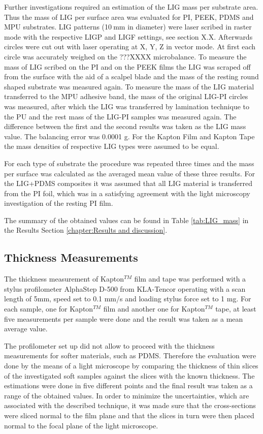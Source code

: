 Further investigations required an estimation of the LIG mass per substrate area. Thus the mass of LIG per surface area was evaluated for PI, PEEK, PDMS and MPU substrates. LIG patterns (10$\:$mm in diameter) were laser scribed in raster mode with the respective LIGP and LIGF settings, see section X.X. Afterwards circles were cut out with laser operating at X, Y, Z in vector mode.  At first each circle was accurately weighed on the ???XXXX microbalance. To measure the mass of LIG scribed on the PI and on the PEEK films the LIG was scraped off from the surface with the aid of a scalpel blade and the mass of the resting round shaped substrate was measured again. To measure the mass of the LIG material transferred to the MPU adhesive band, the mass of the original LIG-PI circles was measured, after which the LIG was transferred by lamination technique to the PU and the rest mass of the LIG-PI samples was measured again. The difference between the first and the second results was taken as the LIG mass value. The balancing error was 0.0001 g. For the Kapton Film and Kapton Tape the mass densities of respective LIG types were assumed to be equal. 

For each type of substrate the procedure was repeated three times and the mass per surface was calculated as the averaged mean value of these three results. For the LIG+PDMS composites it was assumed that all LIG material is transferred from the PI foil, which was in a satisfying agreement with the light microscopy investigation of the resting PI film.

The summary of the obtained values can be found in Table \ref{tab:LIG_mass} in the Results Section \ref{chapter:Results and discussion}.


\subsection{Thickness Measurements}

The thickness measurement of Kapton$^{TM}$ film and tape was performed with a stylus profilometer AlphaStep D-500 from KLA-Tencor operating with a scan length of 5mm, speed set to 0.1 mm/s and loading stylus force set to 1 mg. For each sample, one for Kapton$^{TM}$ film and another one for Kapton$^{TM}$ tape, at least ﬁve measurements per sample were done and the result was taken as a mean average value.
 
The profilometer set up did not allow to proceed with the thickness measurements for softer materials, such as PDMS. Therefore the evaluation were done by the means of a light microscope by comparing the thickness of thin slices of the investigated soft samples against the slices with the known thickness. The estimations were done in five different points and the final result was taken as a range of the obtained values. In order to minimize the uncertainties, which are associated with the described technique, it was made sure that the cross-sections were sliced normal to the film plane and that the slices in turn were then placed normal to the focal plane of the light microscope.

